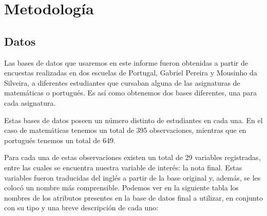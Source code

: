 \documentclass[
]{article}
\begin{document}
\hypertarget{metodologuxeda}{%
\section{Metodología}\label{metodologuxeda}}

\hypertarget{datos}{%
\subsection{Datos}\label{datos}}

Las bases de datos que usaremos en este informe fueron obtenidas a
partir de encuestas realizadas en dos escuelas de Portugal, Gabriel
Pereira y Mousinho da Silveira, a diferentes estudiantes que cursaban
alguna de las asignaturas de matemáticas o portugués. Es así como
obtenemos dos bases diferentes, una para cada asignatura.

Estas bases de datos poseen un número distinto de estudiantes en cada
una. En el caso de matemáticas tenemos un total de 395 observaciones,
mientras que en portugués tenemos un total de 649.

Para cada una de estas observaciones existen un total de 29 variables
registradas, entre las cuales se encuentra nuestra variable de interés:
la nota final. Estas variables fueron traducidas del inglés a partir de
la base original y, además, se les colocó un nombre más comprensible.
Podemos ver en la siguiente tabla los nombres de los atributos presentes
en la base de datos final a utilizar, en conjunto con su tipo y una
breve descripción de cada uno:
\end{document}
